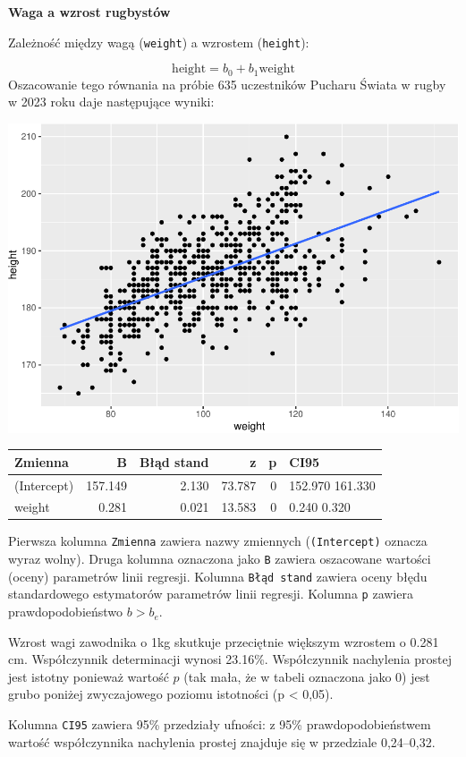 \documentclass[
  openany]{book}
\begin{document}
\begin{example}
\textbf{Waga a wzrost rugbystów}

Zależność między wagą (\texttt{weight}) a wzrostem (\texttt{height}):

\[ \textrm{height} = b_0 + b_1 \textrm{weight}\]
Oszacowanie tego równania na próbie 635 uczestników
Pucharu Świata w rugby w 2023 roku
daje następujące wyniki:

\includegraphics{_main_files/figure-latex/unnamed-chunk-61-1.pdf}

\begin{tabular}{l|r|r|r|r|l}
\hline
Zmienna & B & Błąd stand & z & p & CI95\\
\hline
(Intercept) & 157.149 & 2.130 & 73.787 & 0 & 152.970 161.330\\
\hline
weight & 0.281 & 0.021 & 13.583 & 0 & 0.240 0.320\\
\hline
\end{tabular}

Pierwsza kolumna \texttt{Zmienna} zawiera nazwy zmiennych (\texttt{(Intercept)} oznacza wyraz wolny).
Druga kolumna oznaczona jako \texttt{B} zawiera oszacowane wartości (oceny) parametrów linii regresji.
Kolumna \texttt{Błąd\ stand} zawiera oceny błędu standardowego estymatorów parametrów linii regresji.
Kolumna \texttt{p} zawiera prawdopodobieństwo \(b>b_e\).

Wzrost wagi zawodnika o 1kg
skutkuje przeciętnie większym wzrostem o 0.281 cm. Współczynnik determinacji
wynosi 23.16\%.
Współczynnik nachylenia prostej jest istotny ponieważ wartość \(p\) (tak mała, że w tabeli
oznaczona jako 0)
jest grubo poniżej zwyczajowego poziomu istotności (p \textless{} 0,05).

Kolumna \texttt{CI95} zawiera 95\% przedziały ufności: z 95\% prawdopodobieństwem wartość współczynnika nachylenia
prostej znajduje się w przedziale 0,24--0,32.
\end{example}
\end{document}
